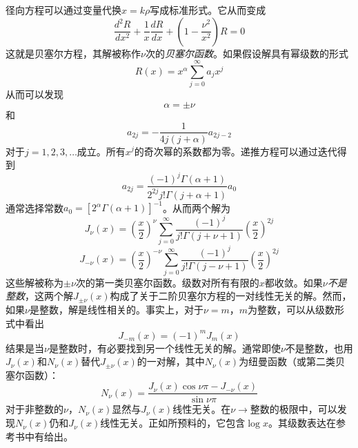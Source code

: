 \documentclass[12pt]{book}
\numberwithin{equation}{chapter}
\numberwithin{figure}{chapter}
\numberwithin{footnote}{page}
\begin{document}
径向方程可以通过变量代换$x=k\rho$写成标准形式。它从而变成
\begin{equation}\label{eq:3.77}
    \frac{d^2R}{dx^2}+\frac{1}{x}\frac{dR}{dx}+(1-\frac{\nu^2}{x^2})R=0
\end{equation}
这就是贝塞尔方程，其解被称作$\nu$次的\textit{贝塞尔函数}。如果假设解具有幂级数的形式
\begin{equation}\label{eq:3.78}
    R(x)=x^\alpha\sum_{j=0}^\infty a_jx^j
\end{equation}
从而可以发现
\begin{equation}\label{eq:3.79}
    \alpha=\pm\nu
\end{equation}
和
\begin{equation}\label{eq:3.80}
    a_{2j}=-\frac{1}{4j(j+\alpha)}a_{2j-2}
\end{equation}
对于$j=1,2,3,\dots$成立。所有$x^j$的奇次幂的系数都为零。递推方程可以通过迭代得到
\begin{equation}\label{eq:3.81}
    a_{2j}=\frac{(-1)^j\Gamma(\alpha+1)}{2^{2j}j!\Gamma(j+\alpha+1)}a_0
\end{equation}
通常选择常数$a_0=[2^\alpha\Gamma(\alpha+1)]^{-1}$。从而两个解为
\begin{equation}\label{eq:3.82}
    J_\nu(x)=(\frac{x}{2})^\nu\sum_{j=0}^\infty\frac{(-1)^j}{j!\Gamma(j+\nu+1)}(\frac{x}{2})^{2j}
\end{equation}
\begin{equation}\label{eq:3.83}
    J_{-\nu}(x)=(\frac{x}{2})^{-\nu}\sum_{j=0}^\infty\frac{(-1)^j}{j!\Gamma(j-\nu+1)}(\frac{x}{2})^{2j}
\end{equation}
这些解被称为$\pm\nu$次的第一类贝塞尔函数。级数对所有有限的$x$都收敛。如果\textit{$\nu$不是整数}，这两个解$J_{\pm\nu}(x)$构成了关于二阶贝塞尔方程的一对线性无关的解。然而，如果$\nu$是整数，解是线性相关的。事实上，对于$\nu=m$，$m$为整数，可以从级数形式中看出
\begin{equation}\label{eq:3.84}
    J_{-m}(x)=(-1)^mJ_m(x)
\end{equation}
结果是当$\nu$是整数时，有必要找到另一个线性无关的解。通常即使$\nu$不是整数，也用$J_\nu(x)$和$N_\nu(x)$替代$J_{\pm\nu}(x)$的一对解，其中$N_\nu(x)$为纽曼函数（或第二类贝塞尔函数）：
\begin{equation}\label{eq:3.85}
    N_\nu(x)=\frac{J_\nu(x)\cos\nu\pi-J_{-\nu}(x)}{\sin\nu\pi}
\end{equation}
对于非整数的$\nu$，$N_\nu(x)$显然与$J_\nu(x)$线性无关。在$\nu\to\mbox{整数}$的极限中，可以发现$N_\nu(x)$仍和$J_\nu(x)$线性无关。正如所预料的，它包含$\log x$。其级数表达在参考书中有给出。
\end{document}
